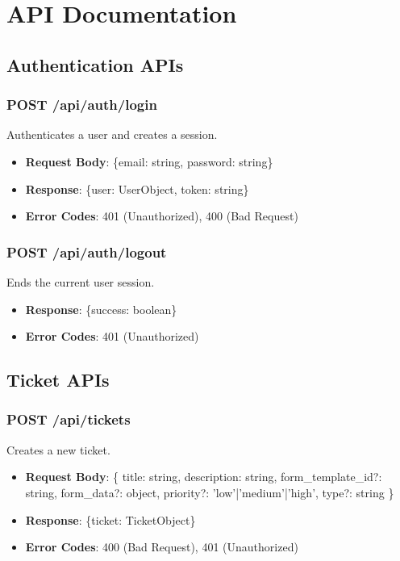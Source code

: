 \documentclass[12pt,a4paper]{article}
\begin{document}
\section{API Documentation}

\subsection{Authentication APIs}

\subsubsection{POST /api/auth/login}
Authenticates a user and creates a session.
\begin{itemize}
    \item \textbf{Request Body}: \{email: string, password: string\}
    \item \textbf{Response}: \{user: UserObject, token: string\}
    \item \textbf{Error Codes}: 401 (Unauthorized), 400 (Bad Request)
\end{itemize}

\subsubsection{POST /api/auth/logout}
Ends the current user session.
\begin{itemize}
    \item \textbf{Response}: \{success: boolean\}
    \item \textbf{Error Codes}: 401 (Unauthorized)
\end{itemize}

\subsection{Ticket APIs}

\subsubsection{POST /api/tickets}
Creates a new ticket.
\begin{itemize}
    \item \textbf{Request Body}: \{
        title: string,
        description: string,
        form\_template\_id?: string,
        form\_data?: object,
        priority?: 'low'|'medium'|'high',
        type?: string
    \}
    \item \textbf{Response}: \{ticket: TicketObject\}
    \item \textbf{Error Codes}: 400 (Bad Request), 401 (Unauthorized)
\end{itemize}
\end{document}
